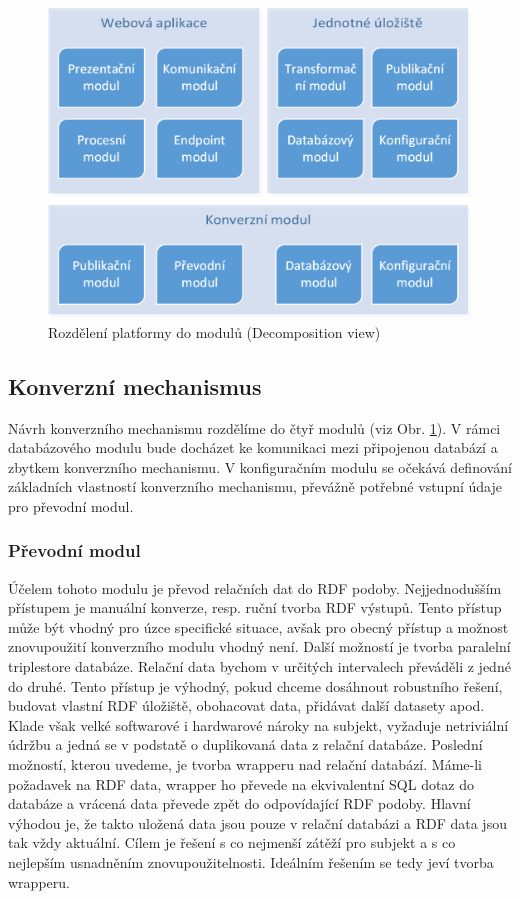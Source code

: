 \begin{figure}[H]
\centerline{\includegraphics[width=\textwidth]{img/decompositionView.eps}}
\caption{Rozdělení platformy do modulů (Decomposition view)}
\label{obr:decompositionView}
\end{figure}

\subsection{Konverzní mechanismus}

Návrh konverzního mechanismu rozdělíme do čtyř modulů (viz Obr. \ref{obr:decompositionView}). V rámci databázového modulu bude docházet ke komunikaci mezi připojenou databází a zbytkem konverzního mechanismu. V konfiguračním modulu se očekává definování základních vlastností konverzního mechanismu, převážně potřebné vstupní údaje pro převodní modul.

\subsubsection*{Převodní modul}

Účelem tohoto modulu je převod relačních dat do RDF podoby. Nejjednodušším přístupem je manuální konverze, resp. ruční tvorba RDF výstupů. Tento přístup může být vhodný pro úzce specifické situace, avšak pro obecný přístup a možnost znovupoužití konverzního modulu vhodný není. Další možností je tvorba paralelní triplestore databáze. Relační data bychom v určitých intervalech převáděli z jedné do druhé. Tento přístup je výhodný, pokud chceme dosáhnout robustního řešení, budovat vlastní RDF úložiště, obohacovat data, přidávat další datasety apod. Klade však velké softwarové i hardwarové nároky na subjekt, vyžaduje netriviální údržbu a jedná se v podstatě o duplikovaná data z relační databáze. Poslední možností, kterou uvedeme, je tvorba wrapperu nad relační databází. Máme-li požadavek na RDF data, wrapper ho převede na ekvivalentní SQL dotaz do databáze a vrácená data převede zpět do odpovídající RDF podoby. Hlavní výhodou je, že takto uložená data jsou pouze v relační databázi a RDF data jsou tak vždy aktuální. Cílem je řešení s co nejmenší zátěží pro subjekt a s co nejlepším usnadněním znovupoužitelnosti. Ideálním řešením se tedy jeví tvorba wrapperu.

